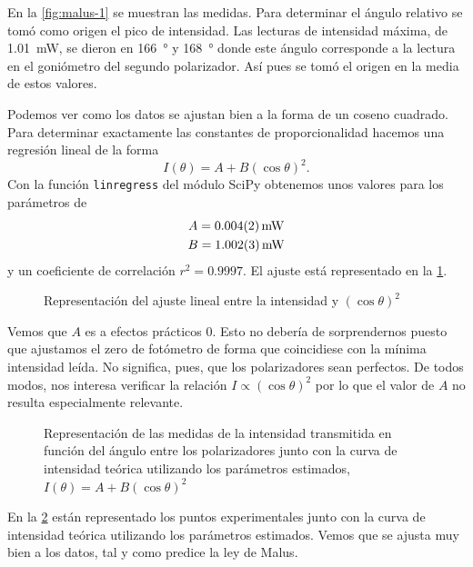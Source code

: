 \documentclass[12pt]{article}
\numberwithin{table}{section}
\numberwithin{figure}{section}
\numberwithin{equation}{section}
\newcommand{\data}[3]{\SI{#1 \pm #2}{#3}}
\begin{document}
En la \cref{fig:malus-1} se muestran las medidas. Para determinar el ángulo relativo se tomó como origen el pico de intensidad. Las lecturas de intensidad máxima, de \SI{1.01}{mW}, se dieron en \SI{166}{\degree} y \SI{168}{\degree} donde este ángulo corresponde a la lectura en el goniómetro del segundo polarizador. Así pues se tomó el origen en la media de estos valores. 

Podemos ver como los datos se ajustan bien a la forma de un coseno cuadrado. Para determinar exactamente las constantes de proporcionalidad hacemos una regresión lineal de la forma
\begin{equation} \label{eqn:regresión}
	I(\theta) = A + B(\cos{\theta})^2.
\end{equation}
Con la función \texttt{linregress} del módulo \textsf{SciPy} obtenemos unos valores para los parámetros de
\begin{equation} \label{eqn:parametros}
	\begin{gathered}
		A = \data{0.004}{0.002}{mW} \\
		B = \data{1.002}{0.003}{mW}
	\end{gathered}
\end{equation}
y un coeficiente de correlación \( r^2 = \num{0.9997} \). El ajuste está representado en la \cref{fig:regr}.

\begin{figure}[htb]
	\centering \small \sffamily
	
	\caption{Representación del ajuste lineal entre la intensidad y \( (\cos{\theta})^2 \)}  
	\label{fig:regr}
\end{figure}

Vemos que \( A \) es a efectos prácticos 0. Esto no debería de sorprendernos puesto que ajustamos el zero de fotómetro de forma que coincidiese con la mínima intensidad leída. No significa, pues, que los polarizadores sean perfectos. De todos modos, nos interesa verificar la relación \( I \propto (\cos{\theta})^2 \) por lo que el valor de \( A \) no resulta especialmente relevante.

\begin{figure}[htb]
	\centering \small \sffamily
	
	\caption{Representación de las medidas de la intensidad transmitida en función del ángulo entre los polarizadores junto con la curva de intensidad teórica utilizando los parámetros estimados, \( I(\theta) = A + B(\cos{\theta})^2 \)}  
	\label{fig:malus-2}
\end{figure}

En la \cref{fig:malus-2} están representado los puntos experimentales junto con la curva de intensidad teórica utilizando los parámetros estimados. Vemos que se ajusta muy bien a los datos, tal y como predice la ley de Malus.
\end{document}
